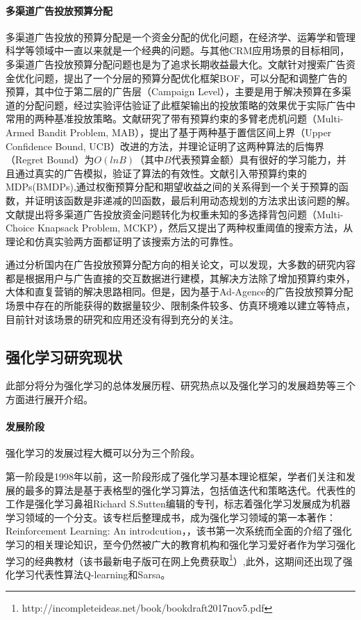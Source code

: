 \paragraph{多渠道广告投放预算分配}
多渠道广告投放的预算分配是一个资金分配的优化问题，在经济学、运筹学和管理科学等领域中一直以来就是一个经典的问题\citep{zhang2017multi}。与其他CRM应用场景的目标相同，多渠道广告投放预算分配问题也是为了追求长期收益最大化。文献\citep{yang2012budget}针对搜索广告资金优化问题，提出了一个分层的预算分配优化框架BOF，可以分配和调整广告的预算，其中位于第二层的广告层（Campaign Level），主要是用于解决预算在多渠道的分配问题，经过实验评估验证了此框架输出的投放策略的效果优于实际广告中常用的两种基准投放策略。文献\citep{ding2013multi}研究了带有预算约束的多臂老虎机问题（Multi-Armed Bandit Problem, MAB），提出了基于两种基于置信区间上界（Upper Confidence Bound, UCB）改进的方法，并理论证明了这两种算法的后悔界（Regret Bound）为$O(lnB)$（其中$B$代表预算金额）具有很好的学习能力，并且通过真实的广告模拟，验证了算法的有效性。文献\citep{boutilier2016budget}引入带预算约束的MDPs(BMDPs),通过权衡预算分配和期望收益之间的关系得到一个关于预算的函数，并证明该函数是非递减的凹函数，最后利用动态规划的方法求出该问题的解。文献\citep{zhang2017multi}提出将多渠道广告投放资金问题转化为权重未知的多选择背包问题（Multi-Choice Knapsack Problem, MCKP），然后又提出了两种权重阈值的搜索方法，从理论和仿真实验两方面都证明了该搜索方法的可靠性。

通过分析国内在广告投放预算分配方向的相关论文，可以发现，大多数的研究内容都是根据用户与广告直接的交互数据进行建模，其解决方法除了增加预算约束外，大体和直复营销的解决思路相同。但是，因为基于Ad-Agence的广告投放预算分配场景中存在的所能获得的数据量较少、限制条件较多、仿真环境难以建立等特点，目前针对该场景的研究和应用还没有得到充分的关注。

\subsection{强化学习研究现状}
此部分将分为强化学习的总体发展历程、研究热点以及强化学习的发展趋势等三个方面进行展开介绍。

\paragraph{发展阶段}
强化学习的发展过程大概可以分为三个阶段。

第一阶段是1998年以前，这一阶段形成了强化学习基本理论框架，学者们关注和发展的最多的算法是基于表格型的强化学习算法，包括值迭代和策略迭代。代表性的工作是强化学习鼻祖Richard S.Sutten编辑的专刊，标志着强化学习发展成为机器学习领域的一个分支。该专栏后整理成书，成为强化学习领域的第一本著作：Reinforcement Learning: An introdcution，，该书第一次系统而全面的介绍了强化学习的相关理论知识，至今仍然被广大的教育机构和强化学习爱好者作为学习强化学习的经典教材（该书最新电子版可在网上免费获取\footnote{http://incompleteideas.net/book/bookdraft2017nov5.pdf}）,此外，这期间还出现了强化学习代表性算法Q-learning\citep{watkins1992q}和Sarsa\citep{rummery1994line}。

